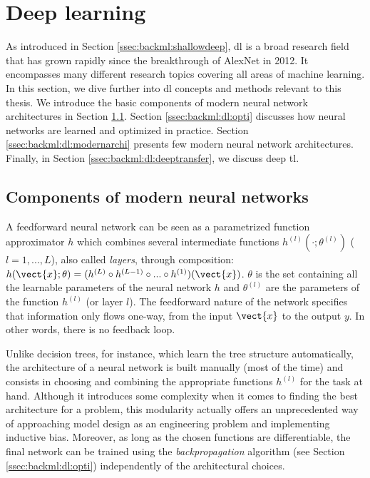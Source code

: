 \section{Deep learning}
\label{sec:backml:deeplearning}

As introduced in Section \ref{ssec:backml:shallowdeep}, \acrlong{dl} is a broad
research field that has grown rapidly since the breakthrough of AlexNet in 2012.
It encompasses many different research topics covering all areas of machine
learning. In this section, we dive further into \acrlong{dl} concepts and
methods relevant to this thesis. We introduce the basic components of modern neural
network architectures in Section \ref{ssec:backml:dp:components}. Section
\ref{ssec:backml:dl:opti} discusses how neural networks are learned and optimized
in practice. Section \ref{ssec:backml:dl:modernarchi} presents few modern neural
network architectures. Finally, in Section \ref{ssec:backml:dl:deeptransfer}, we
discuss deep \acrlong{tl}.

\subsection{Components of modern neural networks}
\label{ssec:backml:dp:components}

A feedforward neural network can be seen as a parametrized function approximator
$h$ which combines several intermediate functions $h^{(l)}(\cdot; \theta^{(l)})$
($l=1, ..., L$), also called \textit{layers}, through composition:
$h(\vect{x}; \theta) = (h^{(L)} \circ h^{(L-1)} \circ ... \circ h^{(1)})(\vect{x})$.
$\theta$ is the set containing all the learnable parameters of the neural network
$h$ and $\theta^{(l)}$ are the parameters of the function $h^{(l)}$ (or layer
$l$). The feedforward nature of the network specifies that information only flows
one-way, from the input $\vect{x}$ to the output $y$. In other words, there is no
feedback loop.

Unlike decision trees, for instance, which learn the tree structure automatically,
the architecture of a neural network is built manually (most of the time) and
consists in choosing and combining the appropriate functions $h^{(l)}$ for the
task at hand. Although it introduces some complexity when it comes to finding the
best architecture for a problem, this modularity actually offers an unprecedented
way of approaching model design as an engineering problem and implementing inductive
bias. Moreover, as long as the chosen functions are differentiable, the final
network can be trained using the \textit{backpropagation} algorithm (see Section
\ref{ssec:backml:dl:opti}) independently of the architectural choices.

